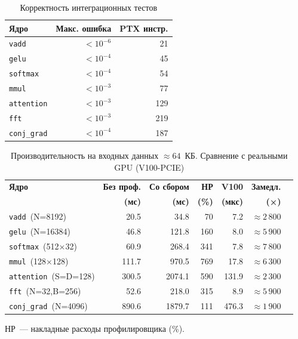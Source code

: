 \begin{table}[h]
  \caption{Корректность интеграционных тестов}
  \label{tab:integration_correctness}
  \centering
  \begin{tabular}{lrr}
    \toprule
    \textbf{Ядро} & \textbf{Макс. ошибка} & \textbf{PTX инстр.} \\
    \midrule
    \texttt{vadd}       & $< 10^{-6}$ & 21 \\
    \texttt{gelu}       & $< 10^{-4}$ & 45 \\
    \texttt{softmax}    & $< 10^{-4}$ & 54 \\
    \texttt{mmul}       & $< 10^{-3}$ & 77 \\
    \texttt{attention}  & $< 10^{-3}$ & 129 \\
    \texttt{fft}        & $< 10^{-3}$ & 219 \\
    \texttt{conj\_grad} & $< 10^{-4}$ & 187 \\
    \bottomrule
  \end{tabular}
\end{table}

\begin{table}[h]
  \caption{Производительность на входных данных $\approx 64$~КБ. Сравнение с реальными GPU (V100-PCIE)}
  \label{tab:integration_results}
  \centering
  \footnotesize
  \begin{tabular}{lrrrrrr}
    \toprule
    \textbf{Ядро} &
    \textbf{Без проф.} & \textbf{Со сбором} & \textbf{НР} &
    \textbf{V100} &
    \textbf{Замедл.} \\
    & \textbf{(мс)} & \textbf{(мс)} & \textbf{(\%)} &
    \textbf{(мкс)} & \textbf{(×)} \\
    \midrule
    \texttt{vadd}~(N=8192)       &   20.5 &   34.8 &  70 &   7.2 &  $\approx 2\,800$ \\
    \texttt{gelu}~(N=16384)      &   46.8 &  121.8 & 160 &   8.0 &  $\approx 5\,900$ \\
    \texttt{softmax}~(512×32)    &   60.9 &  268.4 & 341 &   7.8 &  $\approx 7\,800$ \\
    \texttt{mmul}~(128×128)      &  111.7 &  970.5 & 769 &  17.8 &  $\approx 6\,300$ \\
    \texttt{attention}~(S=D=128) &  300.5 & 2074.1 & 590 & 131.9 &  $\approx 2\,300$ \\
    \texttt{fft}~(N=32,B=256)    &   52.6 &  218.0 & 315 &   8.9 &  $\approx 5\,900$ \\
    \texttt{conj\_grad}~(N=4096) &  890.6 & 1879.7 & 111 & 476.3 &  $\approx 1\,900$ \\
    \bottomrule
  \end{tabular}
  \begin{flushleft}
  {\footnotesize НР~--- накладные расходы профилировщика (\%).}
  \end{flushleft}
\end{table}

